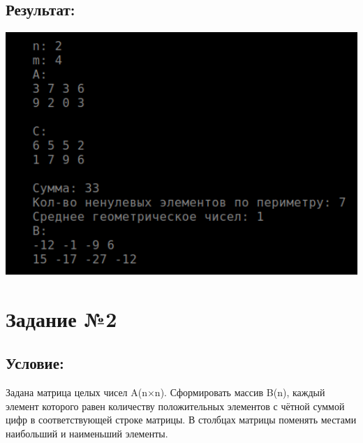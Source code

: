 \documentclass[a4paper]{article}
\begin{document}
\subsection{Результат:}
\includegraphics[width=1\textwidth]{1.png}
\newpage
\section{Задание №2} 
\subsection{Условие:}
Задана матрица целых чисел A(n×n). Сформировать массив B(n), каждый элемент которого равен количеству положительных элементов с чётной суммой цифр в  соответствующей строке матрицы. В столбцах матрицы поменять местами наибольший и наименьший элементы.
\end{document}
